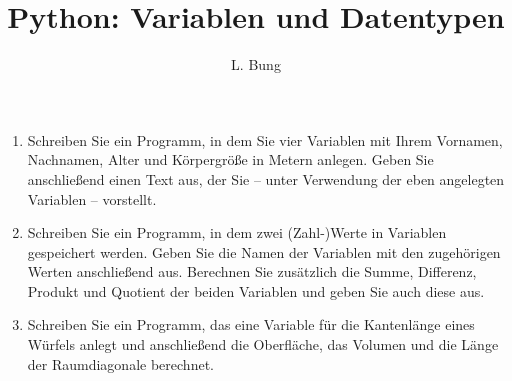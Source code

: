 \documentclass[11pt, a4paper, oneside]{article}
\begin{document}
	\author{L. Bung}
	\title{Python: Variablen \hspace{15cm} und Datentypen}
	\subject{Informatik}
	\maketitle
	
	
	
	\begin{enumerate}[label=\alph*)]
		\item Schreiben Sie ein Programm, in dem Sie vier Variablen mit Ihrem Vornamen, Nachnamen, Alter und Körpergröße in Metern anlegen.
		Geben Sie anschließend einen Text aus, der Sie -- unter Verwendung der eben angelegten Variablen -- vorstellt.
		
		\item  Schreiben Sie ein Programm, in dem zwei (Zahl-)Werte in Variablen gespeichert werden.
		Geben Sie die Namen der Variablen mit den zugehörigen Werten anschließend aus.
		Berechnen Sie zusätzlich die Summe, Differenz, Produkt und Quotient der beiden Variablen und geben Sie auch diese aus.
	
		\item Schreiben Sie ein Programm, das eine Variable für die Kantenlänge eines Würfels anlegt und anschließend die Oberfläche, das Volumen und die Länge der Raumdiagonale berechnet.
	\end{enumerate}
	
\end{document}
